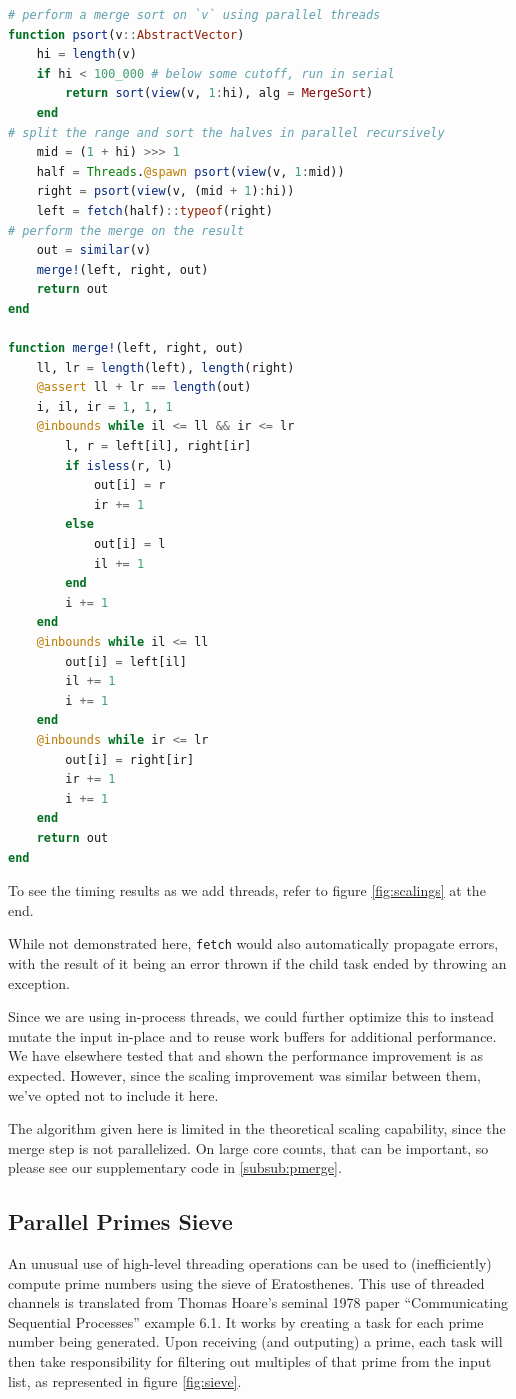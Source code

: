 \documentclass{juliacon}
\begin{document}
\begin{lstlisting}[language = Julia]
# perform a merge sort on `v` using parallel threads
function psort(v::AbstractVector)
    hi = length(v)
    if hi < 100_000 # below some cutoff, run in serial
        return sort(view(v, 1:hi), alg = MergeSort)
    end
# split the range and sort the halves in parallel recursively
    mid = (1 + hi) >>> 1
    half = Threads.@spawn psort(view(v, 1:mid))
    right = psort(view(v, (mid + 1):hi))
    left = fetch(half)::typeof(right)
# perform the merge on the result
    out = similar(v)
    merge!(left, right, out)
    return out
end

function merge!(left, right, out)
    ll, lr = length(left), length(right)
    @assert ll + lr == length(out)
    i, il, ir = 1, 1, 1
    @inbounds while il <= ll && ir <= lr
        l, r = left[il], right[ir]
        if isless(r, l)
            out[i] = r
            ir += 1
        else
            out[i] = l
            il += 1
        end
        i += 1
    end
    @inbounds while il <= ll
        out[i] = left[il]
        il += 1
        i += 1
    end
    @inbounds while ir <= lr
        out[i] = right[ir]
        ir += 1
        i += 1
    end
    return out
end
\end{lstlisting}

To see the timing results as we add threads, refer to figure \ref{fig:scalings} at the end.

While not demonstrated here, \verb|fetch| would also automatically propagate errors, with the result of it being an error thrown if the child task ended by throwing an exception.

Since we are using in-process threads, we could further optimize this to instead mutate the input in-place and to reuse work buffers for additional performance. We have elsewhere tested that and shown the performance improvement is as expected. However, since the scaling improvement was similar between them, we've opted not to include it here.

The algorithm given here is limited in the theoretical scaling capability, since the merge step is not parallelized. On large core counts, that can be important, so please see our supplementary code in \ref{subsub:pmerge}.

\subsection{Parallel Primes Sieve}
\label{subsub:pprimes}

An unusual use of high-level threading operations can be used to (inefficiently) compute prime numbers using the sieve of Eratosthenes.
This use of threaded channels is translated from Thomas Hoare's seminal 1978 paper ``Communicating Sequential Processes''\cite{Hoare:1978:CSP:359576.359585} example 6.1. It works by creating a task for each prime number being generated. Upon receiving (and outputing) a prime, each task will then take responsibility for filtering out multiples of that prime from the input list, as represented in figure \ref{fig:sieve}.
\end{document}
